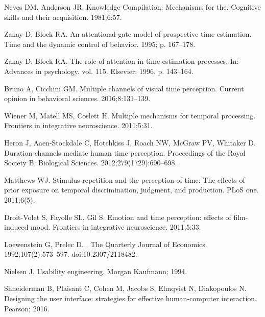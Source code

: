 \documentclass[10pt,letterpaper]{article}
\begin{document}
\begin{thebibliography}{10}
  Neves DM, Anderson JR.
  \newblock Knowledge Compilation: Mechanisms for the.
  \newblock Cognitive skills and their acquisition. 1981;6:57.
  
  Zakay D, Block RA.
  \newblock An attentional-gate model of prospective time estimation.
  \newblock Time and the dynamic control of behavior. 1995; p. 167--178.
  
  Zakay D, Block RA.
  \newblock The role of attention in time estimation processes.
  \newblock In: Advances in psychology. vol. 115. Elsevier; 1996. p. 143--164.
  
  Bruno A, Cicchini GM.
  \newblock Multiple channels of visual time perception.
  \newblock Current opinion in behavioral sciences. 2016;8:131--139.
  
  Wiener M, Matell MS, Coslett H.
  \newblock Multiple mechanisms for temporal processing.
  \newblock Frontiers in integrative neuroscience. 2011;5:31.
  
  Heron J, Aaen-Stockdale C, Hotchkiss J, Roach NW, McGraw PV, Whitaker D.
  \newblock Duration channels mediate human time perception.
  \newblock Proceedings of the Royal Society B: Biological Sciences.
    2012;279(1729):690--698.
  
  Matthews WJ.
  \newblock Stimulus repetition and the perception of time: The effects of prior
    exposure on temporal discrimination, judgment, and production.
  \newblock PLoS one. 2011;6(5).
  
  Droit-Volet S, Fayolle SL, Gil S.
  \newblock Emotion and time perception: effects of film-induced mood.
  \newblock Frontiers in integrative neuroscience. 2011;5:33.
  
  Loewenstein G, Prelec D.
  .
  \newblock The Quarterly Journal of Economics. 1992;107(2):573--597.
  \newblock doi:{10.2307/2118482}.
  
  Nielsen J.
  \newblock Usability engineering.
  \newblock Morgan Kaufmann; 1994.
  
  Shneiderman B, Plaisant C, Cohen M, Jacobs S, Elmqvist N, Diakopoulos N.
  \newblock Designing the user interface: strategies for effective human-computer
    interaction.
  \newblock Pearson; 2016.
  

\end{thebibliography}
\end{document}
